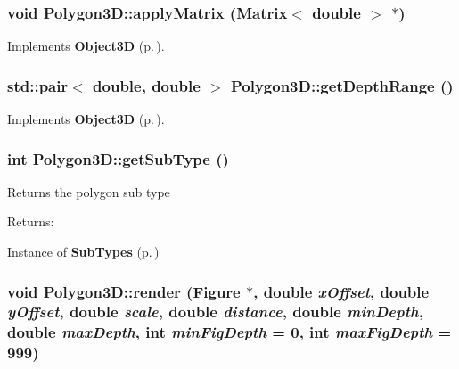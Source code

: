 \subsubsection{\setlength{\rightskip}{0pt plus 5cm}void Polygon3D::apply\-Matrix ({\bf Matrix}$<$ double $>$ $\ast$)\hspace{0.3cm}{\tt  [virtual]}}\label{classPolygon3D_a6}




Implements {\bf Object3D} {\rm (p.\,\pageref{classObject3D_a2})}.
\subsubsection{\setlength{\rightskip}{0pt plus 5cm}std::pair$<$ double, double $>$ Polygon3D::get\-Depth\-Range ()\hspace{0.3cm}{\tt  [virtual]}}\label{classPolygon3D_a4}




Implements {\bf Object3D} {\rm (p.\,\pageref{classObject3D_a0})}.
\subsubsection{\setlength{\rightskip}{0pt plus 5cm}int Polygon3D::get\-Sub\-Type ()\hspace{0.3cm}{\tt  [inline]}}\label{classPolygon3D_a3}


Returns the polygon sub type \begin{Desc}
\item[Returns: ]\par
Instance of {\bf Sub\-Types} {\rm (p.\,\pageref{classPolygon3D_s5})} \end{Desc}
\subsubsection{\setlength{\rightskip}{0pt plus 5cm}void Polygon3D::render ({\bf Figure} $\ast$, double {\em x\-Offset}, double {\em y\-Offset}, double {\em scale}, double {\em distance}, double {\em min\-Depth}, double {\em max\-Depth}, int {\em min\-Fig\-Depth} = 0, int {\em max\-Fig\-Depth} = 999)\hspace{0.3cm}{\tt  [virtual]}}\label{classPolygon3D_a5}




